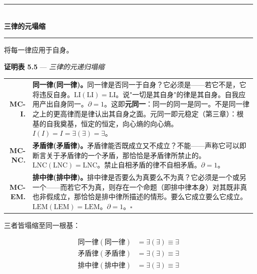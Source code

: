 \documentclass[10pt, openany, oneside]{book}
\renewcommand{\normalsize}{\fontsize{10}{13}\selectfont}
\renewcommand{\footnotesize}{\fontsize{8.5}{11}\selectfont}
\begin{document}

\begin{center}
    \rule{0.3\textwidth}{0.4pt}\\[0.5em]
    {\normalsize\bfseries\scshape 三律的元塌缩}\\[0.3em]
    \rule{0.3\textwidth}{0.4pt}
\end{center}

\vspace{1em}

\noindent 将每一律应用于自身。

\textbf{证明表 5.5} --- \textit{三律的元递归塌缩}

\vspace{0.5em}

{\footnotesize
\noindent\begin{tabular}{r p{}}
\textbf{MC-I.} & \textbf{同一律(同一律)。}同一律是否同一于自身？它必须是——若它不是，它将违反自身。$\text{LI}(\text{LI}) = \text{LI}$。说"一切是其自身"的律是其自身。自我应用产出自身同一。$\partial = 1$。这即\textbf{元同一}：同一的同一是同一。不是同一律之上的更高律而是律认出其自身之面。元同一即元稳定（第三章）：根基的自我奠基，恒定的恒定，向心熵的向心熵。$I(I) = I = \exists(\exists) = \exists$。\\[0.3em]
\textbf{MC-NC.} & \textbf{矛盾律(矛盾律)。}矛盾律能否既成立又不成立？不能——声称它可以即断言关于矛盾律的一个矛盾，那恰恰是矛盾律所禁止的。$\text{LNC}(\text{LNC}) = \text{LNC}$。禁止自相矛盾的律不自相矛盾。$\partial = 1$。\\[0.3em]
\textbf{MC-EM.} & \textbf{排中律(排中律)。}排中律是否要么为真要么不为真？它必须是一个或另一个——而若它不为真，则存在一个命题（即排中律本身）对其既非真也非假成立，那恰恰是排中律所描述的情形。要么它成立要么它成立。$\text{LEM}(\text{LEM}) = \text{LEM}$。$\partial = 1$。$\square$ \\[0.3em]
\end{tabular}
}

\vspace{0.8em}

\noindent 三者皆塌缩至同一根基：

\begin{align*}
\text{同一律}(\text{同一律}) &= \exists(\exists) \equiv \exists \\
\text{矛盾律}(\text{矛盾律}) &= \exists(\exists) \equiv \exists \\
\text{排中律}(\text{排中律}) &= \exists(\exists) \equiv \exists
\end{align*}
\end{document}
